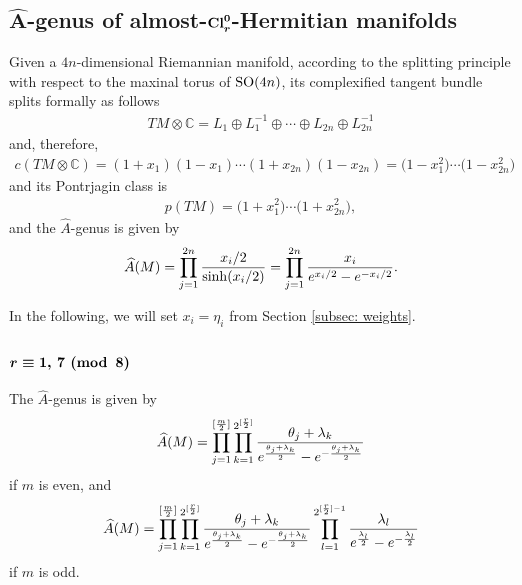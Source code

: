 \documentclass[10pt,a4paper]{amsart}
\newcommand{\A}{\mbox{$\widehat A$}}
\numberwithin{equation}{section}
\begin{document}
\subsection[$\widehat A$-genus of almost-${\rm Cl}_r^0$-Hermitian manifolds]{$\boldsymbol{\widehat A}$-genus of almost-$\boldsymbol{{\rm Cl}_r^0}$-Hermitian manifolds}

Given a $4n$-dimensional Riemannian manifold, according to the splitting principle with respect to the maxinal torus of ${\rm SO}(4n)$, its complexif\/ied tangent bundle splits formally as follows
\begin{gather*}TM\otimes \mathbb{C} = L_1\oplus L_1^{-1} \oplus\cdots\oplus L_{2n}\oplus L_{2n}^{-1}\end{gather*}
and, therefore,
\begin{gather*}
c(TM\otimes \mathbb{C}) = (1+x_1)(1-x_1)\cdots(1+x_{2n})(1-x_{2n})= \big(1-x_1^2\big)\cdots\big(1-x_{2n}^2\big)
\end{gather*}
and its Pontrjagin class is
\begin{gather*}
p(TM) = \big(1+x_1^2\big)\cdots \big(1+x_{2n}^2\big),
\end{gather*}
and the \A-genus is given by
\begin{gather*}
\A(M) =\prod_{j=1}^{2n} {x_i/2\over \sinh(x_i/2)} =\prod_{j=1}^{2n} {x_i\over e^{x_i/2}-e^{-x_i/2}}.
\end{gather*}

In the following, we will set $x_i=\eta_i$ from Section \ref{subsec: weights}.

\subsubsection[$r\equiv 1,\,7 \,\,{\rm (mod\,\,\,8)}$]{$\boldsymbol{r\equiv 1,\,7 \,\,{\rm (mod\,\,\,8)}}$}

The \A-genus is given by
\begin{gather*}
\A(M)
=\prod_{j=1}^{[{m\over 2}]}\prod_{k=1}^{2^{[{r\over 2}]}}{\theta_j + \lambda_k\over e^{\theta_j + \lambda_k\over 2}
-e^{-{\theta_j + \lambda_k\over 2}}}
\end{gather*}
if $m$ is even, and
\begin{gather*}
\A(M)
=\prod_{j=1}^{[{m\over 2}]}\prod_{k=1}^{2^{[{r\over 2}]}}{\theta_j + \lambda_k\over e^{\theta_j + \lambda_k\over 2}
-e^{-{\theta_j + \lambda_k\over 2}}}
\prod_{l=1}^{2^{[{r\over 2}]-1}} {\lambda_l\over e^{\lambda_l\over 2}
-e^{-{\lambda_l\over 2}}}
\end{gather*}
if $m$ is odd.
\end{document}
